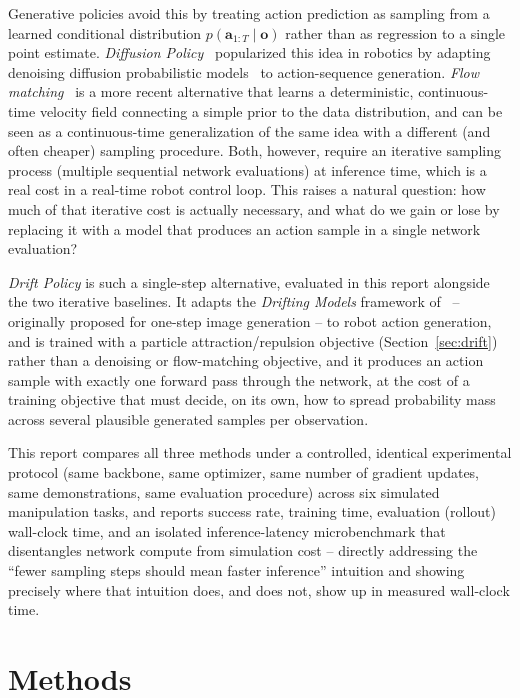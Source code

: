 \documentclass[11pt]{article}
\begin{document}
Generative policies avoid this by treating action prediction as sampling from
a learned conditional distribution $p(\mathbf{a}_{1:T} \mid \mathbf{o})$
rather than as regression to a single point estimate. \emph{Diffusion
Policy}~\cite{chi2023diffusion} popularized this idea in robotics by adapting
denoising diffusion probabilistic models~\cite{ho2020ddpm} to action-sequence
generation. \emph{Flow matching}~\cite{lipman2023flow} is a more recent
alternative that learns a deterministic, continuous-time velocity field
connecting a simple prior to the data distribution, and can be seen as a
continuous-time generalization of the same idea with a different (and often
cheaper) sampling procedure. Both, however, require an iterative sampling
process (multiple sequential network evaluations) at inference time, which is
a real cost in a real-time robot control loop. This raises a natural
question: how much of that iterative cost is actually necessary, and what do
we gain or lose by replacing it with a model that produces an action sample
in a single network evaluation?

\emph{Drift Policy} is such a single-step alternative, evaluated in this
report alongside the two iterative baselines. It adapts the \emph{Drifting
Models} framework of~\cite{deng2026drifting} -- originally proposed for
one-step image generation -- to robot action generation, and is trained with
a particle attraction/repulsion objective (Section~\ref{sec:drift}) rather than a
denoising or flow-matching objective, and it produces an action sample with
exactly one forward pass through the network, at the cost of a training
objective that must decide, on its own, how to spread probability mass
across several plausible generated samples per observation.

This report compares all three methods under a controlled, identical
experimental protocol (same backbone, same optimizer, same number of gradient
updates, same demonstrations, same evaluation procedure) across six
simulated manipulation tasks, and reports success rate, training time,
evaluation (rollout) wall-clock time, and an isolated inference-latency
microbenchmark that disentangles network compute from simulation cost --
directly addressing the ``fewer sampling steps should mean faster
inference'' intuition and showing precisely where that intuition does, and
does not, show up in measured wall-clock time.

\section{Methods}
\end{document}
